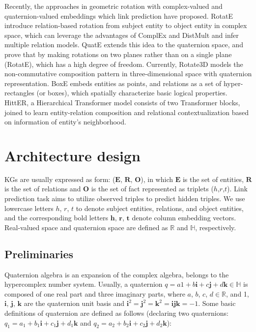\documentclass[letterpaper]{article} \usepackage{aaai20}  \usepackage{times}  \usepackage{helvet} \usepackage{courier}  \usepackage[hyphens]{url}  \usepackage{graphicx} \usepackage{lineno,hyperref,amsmath,amssymb}
\begin{document}
Recently, the approaches in geometric rotation with complex-valued and quaternion-valued embeddings which link prediction have proposed. RotatE\cite{sun2019rotate} introduce relation-based rotation from subject entity to object entity in complex space, which can leverage the advantages of ComplEx\cite{trouillon2016complex} and DistMult\cite{yang2014embedding} and infer multiple relation models. QuatE\cite{zhang2019quaternion} extends this idea to the quaternion space, and prove that by making rotations on two planes rather than on a single plane (RotatE), which has a high degree of freedom. Currently, Rotate3D\cite{gao2020rotate3d} models the non-commutative composition pattern in three-dimensional space with quaternion representation. BoxE\cite{abboud2020boxe} embeds entities as points, and relations as a set of hyper-rectangles (or boxes), which spatially characterize basic logical properties. HittER\cite{chen2020hitter}, a Hierarchical Transformer model consists of two Transformer blocks, joined to learn entity-relation composition and relational contextualization based on information of entity’s neighborhood.

\section{Architecture design }

KGs are usually expressed as form: ($\boldsymbol{E}$, $\boldsymbol{R}$, $\boldsymbol{O}$), in which $\boldsymbol{E}$ is the set of entities, $\boldsymbol{R}$ is the set of relations and $\boldsymbol{O}$ is the set of fact represented as triplets ($h$,$r$,$t$). Link prediction task aims to utilize observed triples to predict hidden triples. We use lowercase letters $h$, $r$, $t$ to denote subject entities, relations, and object entities, and the corresponding bold letters $\boldsymbol{h}$, $\boldsymbol{r}$,  $\boldsymbol{t}$ denote column embedding vectors. Real-valued space and quaternion space are defined as $\mathbb{R}$ and $\mathbb{H}$, respectively.

\subsection{Preliminaries}
Quaternion algebra\cite{hamilton1844lxxviii} is an expansion of the complex algebra, belongs to the hypercomplex number system. Usually, a quaternion $q=a1+b \mathbf{i} + c \mathbf{j} + d \mathbf{k} \in \mathbb{H}$ is composed of one real part and three imaginary parts, where $a$, $b$, $c$, $d \in \mathbb{R}$, and 1, $\mathbf{i}$, $\mathbf{j}$, $\mathbf{k}$ are the quaternion unit basis and $ \mathbf{i} ^2= \mathbf{j} ^2 = \mathbf{k} ^2=\mathbf{ijk} = -1 $. Some basic definitions of quaternion are defined as follows (declaring two quaternions: $q_1 = a_1 + b_1 \mathbf{i}+c_1 \mathbf{j}+d_1 \mathbf{k}$ and $q_2 = a_2 + b_2 \mathbf{i}+c_2 \mathbf{j}+d_2 \mathbf{k}$):
\end{document}
